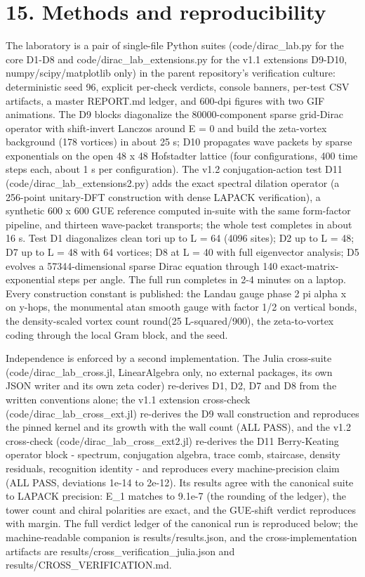 \documentclass[11pt,a4paper]{article}
\begin{document}
\section{15. Methods and reproducibility}
The laboratory is a pair of single-file Python suites (code/dirac\_\allowbreak{}lab.py for the core D1-D8 and code/dirac\_\allowbreak{}lab\_\allowbreak{}extensions.py for the v1.1 extensions D9-D10, numpy/scipy/matplotlib only) in the parent repository's verification culture: deterministic seed 96, explicit per-check verdicts, console banners, per-test CSV artifacts, a master REPORT.md ledger, and 600-dpi figures with two GIF animations. The D9 blocks diagonalize the 80000-component sparse grid-Dirac operator with shift-invert Lanczos around E = 0 and build the zeta-vortex background (178 vortices) in about 25 s; D10 propagates wave packets by sparse exponentials on the open 48 x 48 Hofstadter lattice (four configurations, 400 time steps each, about 1 s per configuration). The v1.2 conjugation-action test D11 (code/dirac\_\allowbreak{}lab\_\allowbreak{}extensions2.py) adds the exact spectral dilation operator (a 256-point unitary-DFT construction with dense LAPACK verification), a synthetic 600 x 600 GUE reference computed in-suite with the same form-factor pipeline, and thirteen wave-packet transports; the whole test completes in about 16 s. Test D1 diagonalizes clean tori up to L = 64 (4096 sites); D2 up to L = 48; D7 up to L = 48 with 64 vortices; D8 at L = 40 with full eigenvector analysis; D5 evolves a 57344-dimensional sparse Dirac equation through 140 exact-matrix-exponential steps per angle. The full run completes in 2-4 minutes on a laptop. Every construction constant is published: the Landau gauge phase 2 pi alpha x on y-hops, the monumental atan smooth gauge with factor 1/2 on vertical bonds, the density-scaled vortex count round(25 L-squared/900), the zeta-to-vortex coding through the local Gram block, and the seed.

Independence is enforced by a second implementation. The Julia cross-suite (code/dirac\_\allowbreak{}lab\_\allowbreak{}cross.jl, LinearAlgebra only, no external packages, its own JSON writer and its own zeta coder) re-derives D1, D2, D7 and D8 from the written conventions alone; the v1.1 extension cross-check (code/dirac\_\allowbreak{}lab\_\allowbreak{}cross\_\allowbreak{}ext.jl) re-derives the D9 wall construction and reproduces the pinned kernel and its growth with the wall count (ALL PASS), and the v1.2 cross-check (code/dirac\_\allowbreak{}lab\_\allowbreak{}cross\_\allowbreak{}ext2.jl) re-derives the D11 Berry-Keating operator block - spectrum, conjugation algebra, trace comb, staircase, density residuals, recognition identity - and reproduces every machine-precision claim (ALL PASS, deviations 1e-14 to 2e-12). Its results agree with the canonical suite to LAPACK precision: E\_\allowbreak{}1 matches to 9.1e-7 (the rounding of the ledger), the tower count and chiral polarities are exact, and the GUE-shift verdict reproduces with margin. The full verdict ledger of the canonical run is reproduced below; the machine-readable companion is results/results.json, and the cross-implementation artifacts are results/cross\_\allowbreak{}verification\_\allowbreak{}julia.json and results/CROSS\_\allowbreak{}VERIFICATION.md.
\end{document}
